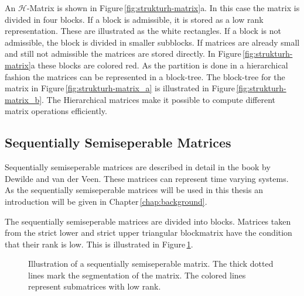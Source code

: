 \documentclass[doctype=mastersthesis,BCOR=15mm,biblatex]{ldvbook}%
\begin{document}
An $\mathcal{H}$-Matrix is shown in Figure\,\ref{fig:strukturh-matrix}a. 
In this case the matrix is divided in four blocks.
If a block is admissible, it is stored as a low rank representation. These are illustrated as the white rectangles.
If a block is not admissible, the block is divided in smaller subblocks.
If matrices are already small and still not admissible the matrices are stored directly. In Figure\,\ref{fig:strukturh-matrix}a these blocks are colored red.
As the partition is done in a hierarchical fashion the matrices can be represented in a block-tree. 
The block-tree for the matrix in Figure\,\ref{fig:strukturh-matrix_a} is illustrated in Figure\,\ref{fig:strukturh-matrix_b}.
The Hierarchical matrices make it possible to compute different matrix operations efficiently. %

\subsection{Sequentially Semiseperable Matrices}
Sequentially semiseperable matrices are described in detail in the book by Dewilde and van der Veen\cite{dewilde_time-varying_1998}.
These matrices can represent time varying systems.
As the sequentially semiseperable matrices will be used in this thesis an introduction will be given in Chapter\,\ref{chap:background}. 

The sequentially semiseperable matrices are divided into blocks.
Matrices taken from the strict lower and strict upper triangular blockmatrix have the condition that their rank is low.
This is illustrated in Figure\,\ref{fig:sequentiallysep}.

\begin{figure}[htb]
	\centering
	
	\caption{Illustration of a sequentially semiseperable matrix. The thick dotted lines mark the segmentation of the matrix. The colored lines represent submatrices with low rank.}
	\label{fig:sequentiallysep}
\end{figure}
\end{document}
